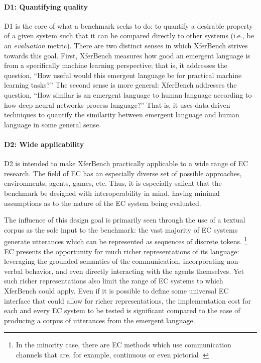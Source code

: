 \paragraph{D1: Quantifying quality}
D1 is the core of what a benchmark seeks to do: to quantify a desirable property of a given system such that it can be compared directly to other systems (i.e., be an \emph{evaluation} metric).
There are two distinct senses in which XferBench strives towards this goal.
First, XferBench measures how good an emergent language is from a specifically machine learning perspective;
  that is, it addresses the question, ``How useful would this emergent language be for practical machine learning tasks?''
The second sense is more general: XferBench addresses the question, ``How similar is an emergent language to human language according to how deep neural networks process language?''
That is, it uses data-driven techniques to quantify the similarity between emergent language and human language in some general sense.

\paragraph{D2: Wide applicability}
D2 is intended to make XferBench practically applicable to a wide range of EC research.
The field of EC has an especially diverse set of possible approaches, environments, agents, games, etc.
Thus, it is especially salient that the benchmark be designed with interoperability in mind, having minimal assumptions as to the nature of the EC system being evaluated.

The influence of this design goal is primarily seen through the use of a textual corpus as the sole input to the benchmark: the vast majority of EC systems generate utterances which can be represented as sequences of discrete tokens.
\unskip\footnote{In the minority case, there are EC methods which use communication channels that are, for example, continuous \citep{Eloff2021TowardsLT} or even pictorial \citep{mihai2021learning}.}
EC presents the opportunity for much richer representations of its language: leveraging the grounded semantics of the communication, incorporating non-verbal behavior, and even directly interacting with the agents themselves.
Yet such richer representations also limit the range of EC systems to which XferBench could apply.
Even if it is possible to define some universal EC interface that could allow for richer representations, the implementation cost for each and every EC system to be tested is significant compared to the ease of producing a corpus of utterances from the emergent language.

